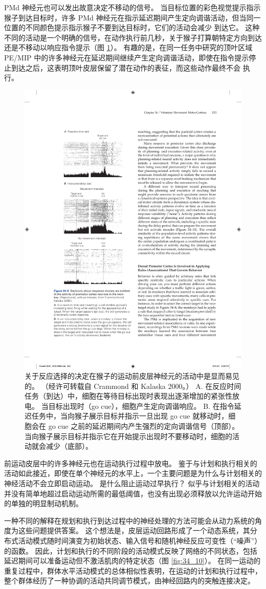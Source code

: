 PMd 神经元也可以发出故意决定不移动的信号。 当目标位置的彩色视觉提示指示猴子到达目标时，许多 PMd 神经元在指示延迟期间产生定向调谐活动，但当同一位置的不同颜色提示指示猴子不要到达目标时，它们的活动会减少 到达它。 
这种不同的活动是一个明确的信号，在动作执行前几秒，关于猴子打算朝特定方向到达还是不移动以响应指令提示（图 \ref{fig:34_9}）。
有趣的是，在同一任务中研究的顶叶区域 PE/MIP 中的许多神经元在延迟期间继续产生定向调谐活动，即使在指令提示停止到达之后，这表明顶叶皮层保留了潜在动作的表征，而这些动作最终不会 执行。

\begin{figure}[htbp]
	\centering
	\includegraphics[width=0.45\linewidth]{chap34/fig_34_9}
	\caption{关于反应选择的决定在猴子的运动前皮层神经元的活动中是显而易见的。 （经许可转载自 Crammond 和 Kalaska 2000。） A. 在反应时间任务（到达）中，细胞在等待目标出现时表现出逐渐增加的紧张性放电。 当目标出现时（go cue），细胞产生定向调谐响应。 B. 在指令延迟任务中，当向猴子展示目标并指示一旦出现 go cue 就移动时，细胞会在 go cue 之前的延迟期间内产生强烈的定向调谐信号（顶部）。 当向猴子展示目标并指示它在开始提示出现时不要移动时，细胞的活动就会减少（底部）。}
	\label{fig:34_9}
\end{figure}

前运动皮层中的许多神经元也在运动执行过程中放电。 鉴于与计划和执行相关的活动如此接近，即使在单个神经元的水平上，一个主要问题是为什么与计划相关的神经活动不会立即启动运动。 是什么阻止运动过早执行？ 似乎与计划相关的活动并没有简单地超过启动运动所需的最低阈值，也没有出现必须释放以允许运动开始的单独的明显制动机制。

一种不同的解释在规划和执行到达过程中的神经处理的方法可能会从动力系统的角度为这些问题提供答案。 这个想法是，皮层运动回路形成了一个动态系统，其分布式活动模式随时间演变为初始状态、输入信号和随机神经反应可变性（“噪声”）的函数。 
因此，计划和执行的不同阶段的活动模式反映了网络的不同状态，包括延迟期间可以准备运动但不激活肌肉的特定状态（图 \ref{fig:34_10}）。
在同一运动的重复过程中，群体水平活动模式的总体相似性表明，在运动的计划和执行过程中，整个群体经历了一种协调的活动共同调节模式，由神经回路内的突触连接决定。

